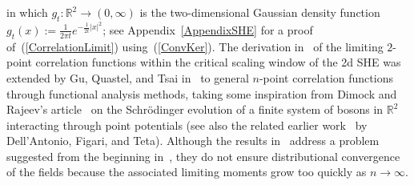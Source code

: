 \documentclass[10pt]{article}
\numberwithin{equation}{section}
\theoremstyle{definition}
\newcommand{\R}{{\mathbb R}}
\begin{document}
in which $g_t:\R^2\rightarrow (0,\infty)$ is the two-dimensional  Gaussian density function $g_t(x):=\frac{ 1  }{ 2\pi t } e^{-\frac{1}{2t}|x|^2}$; see Appendix~\ref{AppendixSHE} for a proof of~(\ref{CorrelationLimit}) using~(\ref{ConvKer}).   The derivation in~\cite{BC}  of the limiting $2$-point correlation functions within the critical scaling window of the 2d SHE was extended by Gu, Quastel, and Tsai in~\cite{GQT} to general $n$-point correlation functions through functional analysis methods, taking some inspiration from Dimock and Rajeev's article~\cite{Dimock} on the Schr\"odinger evolution of a  finite system of bosons in $\R^2$ interacting through point potentials (see also the related earlier  work~\cite{Dell} by Dell'Antonio, Figari, and  Teta). Although the results in~\cite{GQT} address a problem  suggested from the beginning in~\cite[Remark on p.\ 620] {BC}, they do not ensure distributional convergence of the fields  because the associated limiting moments grow too quickly as $n\rightarrow \infty$.
\end{document}
